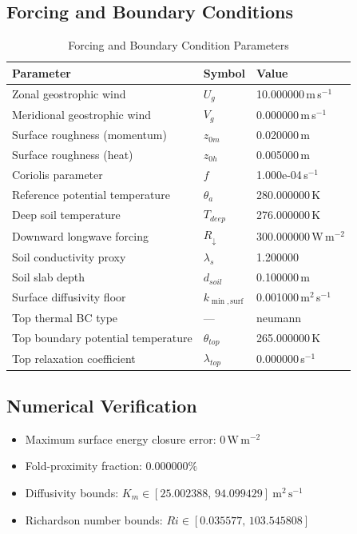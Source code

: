 \subsection{Forcing and Boundary Conditions}
\begin{table}[htbp]
\centering
\caption{Forcing and Boundary Condition Parameters}
\label{tab:scm_parameters_scm_verify_scm_verify_40x4m_0h_report}
\begin{tabular}{lll}
\hline
{\bfseries Parameter} & {\bfseries Symbol} & {\bfseries Value} \\
\hline
Zonal geostrophic wind & $U_g$ & 10.000000\,m\,s$^{-1}$ \\
Meridional geostrophic wind & $V_g$ & 0.000000\,m\,s$^{-1}$ \\
Surface roughness (momentum) & $z_{0m}$ & 0.020000\,m \\
Surface roughness (heat) & $z_{0h}$ & 0.005000\,m \\
Coriolis parameter & $f$ & 1.000e-04\,s$^{-1}$ \\
Reference potential temperature & $\theta_a$ & 280.000000\,K \\
Deep soil temperature & $T_{deep}$ & 276.000000\,K \\
Downward longwave forcing & $R_{\downarrow}$ & 300.000000\,W\,m$^{-2}$ \\
Soil conductivity proxy & $\lambda_s$ & 1.200000 \\
Soil slab depth & $d_{soil}$ & 0.100000\,m \\
Surface diffusivity floor & $k_{\min,\mathrm{surf}}$ & 0.001000\,m$^2$\,s$^{-1}$ \\
Top thermal BC type & --- & neumann \\
Top boundary potential temperature & $\theta_{top}$ & 265.000000\,K \\
Top relaxation coefficient & $\lambda_{top}$ & 0.000000\,s$^{-1}$ \\
\hline
\end{tabular}
\end{table}

\subsection{Numerical Verification}
\begin{itemize}
  \item Maximum surface energy closure error:
  $0\,\mathrm{W\,m^{-2}}$
  \item Fold-proximity fraction:
  $0.000000\%$
  \item Diffusivity bounds:
  $K_m \in [25.002388,\,94.099429]~\mathrm{m^2\,s^{-1}}$
  \item Richardson number bounds:
  $Ri \in [0.035577,\,103.545808]$
\end{itemize}

